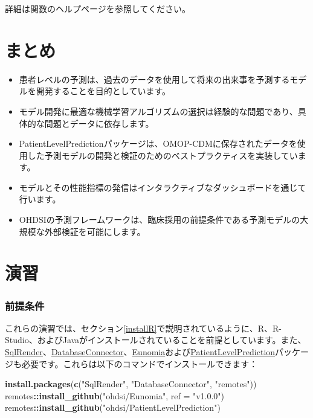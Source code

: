 \documentclass[
  11pt]{book}
\makeatletter
\newenvironment{Shaded}{\begin{snugshade}}{\end{snugshade}}
\newcommand{\AttributeTok}[1]{\textcolor[rgb]{0.13,0.29,0.53}{#1}}
\newcommand{\FunctionTok}[1]{\textcolor[rgb]{0.13,0.29,0.53}{\textbf{#1}}}
\newcommand{\NormalTok}[1]{#1}
\newcommand{\SpecialCharTok}[1]{\textcolor[rgb]{0.81,0.36,0.00}{\textbf{#1}}}
\newcommand{\StringTok}[1]{\textcolor[rgb]{0.31,0.60,0.02}{#1}}
\newenvironment{kframe}{%
\medskip{}
\setlength{\fboxsep}{.8em}
 \def\at@end@of@kframe{}%
 \ifinner\ifhmode%
  \def\at@end@of@kframe{\end{minipage}}%
  \begin{minipage}{\columnwidth}%
 \fi\fi%
 \def\FrameCommand##1{\hskip\@totalleftmargin \hskip-\fboxsep
 \colorbox{myShadeColor}{##1}\hskip-\fboxsep
     \hskip-\linewidth \hskip-\@totalleftmargin \hskip\columnwidth}%
 \MakeFramed {\advance\hsize-\width
   \@totalleftmargin\z@ \linewidth\hsize
   \@setminipage}}%
 {\par\unskip\endMakeFramed%
 \at@end@of@kframe}
\newenvironment{rmdblock}[1]
  {
  \begin{itemize}
  \renewcommand{\labelitemi}{
    \raisebox{-.7\height}[0pt][0pt]{
      {\setkeys{Gin}{width=3em,keepaspectratio}\texttt{[image: images/\#1]}}
    }
  }
  \setlength{\fboxsep}{1em}
  \begin{kframe}
  \item
  }
  {
  \end{kframe}
  \end{itemize}
  }
\newenvironment{rmdsummary}
  {\begin{rmdblock}{summary}}
  {\end{rmdblock}}
\theoremstyle{definition}
\theoremstyle{definition}
\theoremstyle{definition}
\theoremstyle{definition}
\theoremstyle{remark}
\makeatother
\begin{document}
詳細は関数のヘルプページを参照してください。

\section{まとめ}\label{ux307eux3068ux3081-10}

\begin{rmdsummary}
\begin{itemize}
\item
  患者レベルの予測は、過去のデータを使用して将来の出来事を予測するモデルを開発することを目的としています。
\item
  モデル開発に最適な機械学習アルゴリズムの選択は経験的な問題であり、具体的な問題とデータに依存します。
\item
  PatientLevelPredictionパッケージは、OMOP-CDMに保存されたデータを使用した予測モデルの開発と検証のためのベストプラクティスを実装しています。
\item
  モデルとその性能指標の発信はインタラクティブなダッシュボードを通じて行います。
\item
  OHDSIの予測フレームワークは、臨床採用の前提条件である予測モデルの大規模な外部検証を可能にします。
\end{itemize}
\end{rmdsummary}

\section{演習}\label{ux6f14ux7fd2-6}

\subsubsection*{前提条件}\label{ux524dux63d0ux6761ux4ef6-8}

これらの演習では、セクション\ref{installR}で説明されているように、R、R-Studio、およびJavaがインストールされていることを前提としています。また、\href{https://ohdsi.github.io/SqlRender/}{SqlRender}、\href{https://ohdsi.github.io/DatabaseConnector/}{DatabaseConnector}、\href{https://ohdsi.github.io/Eunomia/}{Eunomia}および\href{https://ohdsi.github.io/PatientLevelPrediction/}{PatientLevelPrediction}パッケージも必要です。これらは以下のコマンドでインストールできます：

\begin{Shaded}
\begin{Highlighting}[]
\FunctionTok{install.packages}\NormalTok{(}\FunctionTok{c}\NormalTok{(}\StringTok{"SqlRender"}\NormalTok{, }\StringTok{"DatabaseConnector"}\NormalTok{, }\StringTok{"remotes"}\NormalTok{))}
\NormalTok{remotes}\SpecialCharTok{::}\FunctionTok{install\_github}\NormalTok{(}\StringTok{"ohdsi/Eunomia"}\NormalTok{, }\AttributeTok{ref =} \StringTok{"v1.0.0"}\NormalTok{)}
\NormalTok{remotes}\SpecialCharTok{::}\FunctionTok{install\_github}\NormalTok{(}\StringTok{"ohdsi/PatientLevelPrediction"}\NormalTok{)}
\end{Highlighting}
\end{Shaded}
\end{document}
